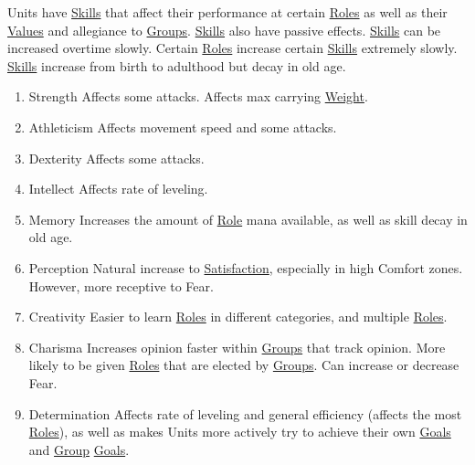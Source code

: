 \documentclass[11pt]{article}
\begin{document}
Units have \hyperref[org58ad070]{Skills} that affect their performance at certain \hyperref[org080bb13]{Roles} as well as their \hyperref[orge4a3133]{Values} and allegiance to \hyperref[org21e4d88]{Groups}. \hyperref[org58ad070]{Skills} also have passive effects. \hyperref[org58ad070]{Skills} can be increased overtime slowly. Certain \hyperref[org080bb13]{Roles} increase certain \hyperref[org58ad070]{Skills} extremely slowly. \hyperref[org58ad070]{Skills} increase from birth to adulthood but decay in old age.\\
\begin{enumerate}
\item Strength
\label{sec:org1f022a1}
Affects some attacks. Affects max carrying \hyperref[orgf5aa833]{Weight}.\\
\item Athleticism
\label{sec:org71879ae}
Affects movement speed and some attacks.\\
\item Dexterity
\label{sec:org044162f}
Affects some attacks.\\
\item Intellect
\label{sec:orgc671a59}
Affects rate of leveling.\\
\item Memory
\label{sec:org8d86ebb}
Increases the amount of \hyperref[orgada42dd]{Role} mana available, as well as skill decay in old age.\\
\item Perception
\label{sec:orgf066d1e}
Natural increase to \hyperref[orgda5f73b]{Satisfaction}, especially in high Comfort zones. However, more receptive to Fear.\\
\item Creativity
\label{sec:orgf968eb0}
Easier to learn \hyperref[org080bb13]{Roles} in different categories, and multiple \hyperref[org080bb13]{Roles}.\\
\item Charisma
\label{sec:orgae77bdd}
Increases opinion faster within \hyperref[org21e4d88]{Groups} that track opinion. More likely to be given \hyperref[org080bb13]{Roles} that are elected by \hyperref[org21e4d88]{Groups}. Can increase or decrease Fear.\\
\item Determination
\label{sec:org10ac262}
Affects rate of leveling and general efficiency (affects the most \hyperref[org080bb13]{Roles}), as well as makes Units more actively try to achieve their own \hyperref[org55b3b0b]{Goals} and \hyperref[org3bac9f0]{Group} \hyperref[org55b3b0b]{Goals}.\\
\end{enumerate}
\end{document}

